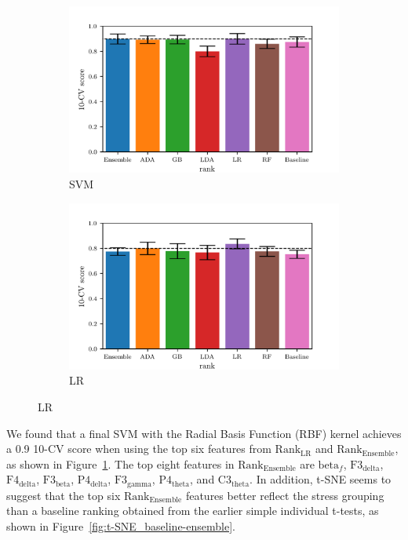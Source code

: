 \documentclass[pdflatex,sn-mathphys]{sn-jnl}%
\theoremstyle{thmstyleone}%
\theoremstyle{thmstyletwo}%
\theoremstyle{thmstylethree}%
\begin{document}
\begin{figure}[h!]
    \centering
    \begin{subfigure}[b]{0.49\textwidth}
        \centering
        \includegraphics[width=\textwidth]{figures/bar_svm_at_6.png}
        \caption{SVM}
        \label{fig:cv_svm}
    \end{subfigure}
    \hfill
    \begin{subfigure}[b]{0.49\textwidth}
        \centering
        \includegraphics[width=\textwidth]{figures/bar_lr_at_9.png}
        \caption{LR}
    \end{subfigure}
\end{figure}

We found that a final SVM with the Radial Basis Function (RBF) kernel achieves a 0.9 10-CV score when using the top six features from $\text{Rank}_{\text{LR}}$ and $\text{Rank}_{\text{Ensemble}}$, as shown in Figure~\ref{fig:cv_svm}. The top eight features in $\text{Rank}_{\text{Ensemble}}$ are $\text{beta}_{f}$, $\text{F3}_{\text{delta}}$, $\text{F4}_{\text{delta}}$, $\text{F3}_{\text{beta}}$, $\text{P4}_{\text{delta}}$, $\text{F3}_{\text{gamma}}$, $\text{P4}_{\text{theta}}$, and $\text{C3}_{\text{theta}}$. In addition, t-SNE seems to suggest that the top six $\text{Rank}_{\text{Ensemble}}$ features better reflect the stress grouping than a baseline ranking obtained from the earlier simple individual t-tests, as shown in Figure~\ref{fig:t-SNE_baseline-ensemble}.
\end{document}
